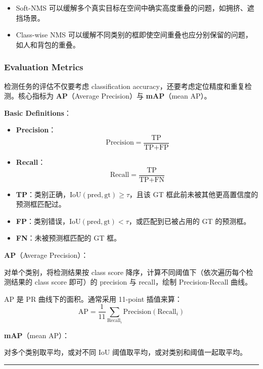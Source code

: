 \begin{itemize}
\tightlist
\item
  Soft-NMS
  可以缓解多个真实目标在空间中确实高度重叠的问题，如拥挤、遮挡场景。
\item
  Class-wise NMS
  可以缓解不同类别的框即使空间重叠也应分别保留的问题，如人和背包的重叠。
\end{itemize}

\subsubsection{Evaluation Metrics}\label{evaluation-metrics}

检测任务的评估不仅要考虑 classification
accuracy，还要考虑定位精度和重复检测。核心指标为 \textbf{AP}（Average
Precision）与 \textbf{mAP}（mean AP）。

\textbf{Basic Definitions}：

\begin{itemize}
\tightlist
\item
  \textbf{Precision}： \[
    \text{Precision} = \frac{\text{TP}}{\text{TP} + \text{FP}}
    \]
\item
  \textbf{Recall}： \[
    \text{Recall} = \frac{\text{TP}}{\text{TP} + \text{FN}}
    \]
\item
  \textbf{TP}：类别正确，\(\text{IoU}(\text{pred}, \text{gt}) \ge \tau\)，且该
  GT 框此前未被其他更高置信度的预测框匹配过。
\item
  \textbf{FP}：类别错误，\(\text{IoU}(\text{pred}, \text{gt}) < \tau\)，或匹配到已被占用的
  GT 的预测框。
\item
  \textbf{FN}：未被预测框匹配的 GT 框。
\end{itemize}

\textbf{AP}（Average Precision）：

对单个类别，将检测结果按 class score
降序，计算不同阈值下（依次遍历每个检测结果的 class score 即可）的
precision 与 recall，绘制 Precision-Recall 曲线。

AP 是 PR 曲线下的面积。通常采用 11-point 插值来算： \[
\text{AP} = \frac{1}{11}\sum_{\text{Recall}_i} \text{Precision}(\text{Recall}_i)
\]

\textbf{mAP}（mean AP）：

对多个类别取平均，或对不同 IoU 阈值取平均，或对类别和阈值一起取平均。

\begin{center}\rule{0.5\linewidth}{0.5pt}\end{center}


